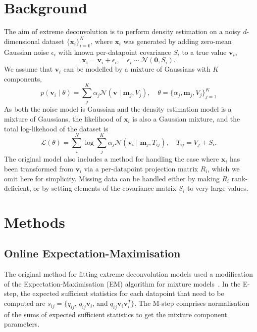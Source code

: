 \documentclass{article}
\newcommand{\bx}{\mathbf{x}}
\newcommand{\bv}{\mathbf{v}}
\newcommand{\bm}{\mathbf{m}}
\begin{document}
\section{Background}

The aim of extreme deconvolution is to perform density estimation on a noisy $d$-dimensional dataset $\{\bx_i\}_{i=0}^N$, where $\bx_i$ was generated by adding zero-mean Gaussian noise $\epsilon_i$ with known per-datapoint covariance $S_i$ to a true value $\bv_i$,
\begin{equation}
  \mathbf{x_i} = \bv_i + \epsilon_i,\quad  \epsilon_i \sim \mathcal{N}(\mathbf{0}, S_i).
\end{equation}
We assume that $\bv_i$ can be modelled by a mixture of Gaussians with $K$ components,
\begin{equation}
p(\bv_i \mid \theta) = \sum_j^K \alpha_j \mathcal{N}(\bv \mid \bm_j, V_j), \quad \theta = \{\alpha_j, \bm_j, V_j\}_{j=1} ^ K
\end{equation}
As both the noise model is Gaussian and the density estimation model is a mixture of Gaussians, the likelihood of $\bx_i$ is also a Gaussian mixture,
and the total log-likehood of the dataset is
\begin{equation}
\mathcal{L}(\theta) = \sum_i^N \log \sum_j^K \alpha_j\mathcal{N}(\bv_i \mid \mathbf{m}_j, T_{ij}), \quad T_{ij} = V_j + S_i.
\end{equation}
The original model also includes a method for handling the case where $\bx_i$ has been transformed from $\bv_i$ via a per-datapoint projection matrix $R_i$, which we omit here for simplicity.
Missing data can be handled either by making $R_i$ rank-deficient, or by setting elements of the covariance matrix $S_i$ to very large values.

\section{Methods}

\subsection{Online Expectation-Maximisation}
The original method for fitting extreme deconvolution models used a modification of the Expectation-Maximisation (EM) algorithm for mixture models~\cite{dempsterMaximumLikelihoodIncomplete1977}.
In the E-step, the expected sufficient statistics for each datapoint that need to be computed are $s_{ij} = \{q_{ij}$, $q_{ij}\bv_i$, and $q_{ij}\bv_i\bv_i^T\}$.
The M-step comprises normalisation of the sums of expected sufficient statistics to get the mixture component parameters.
\end{document}

